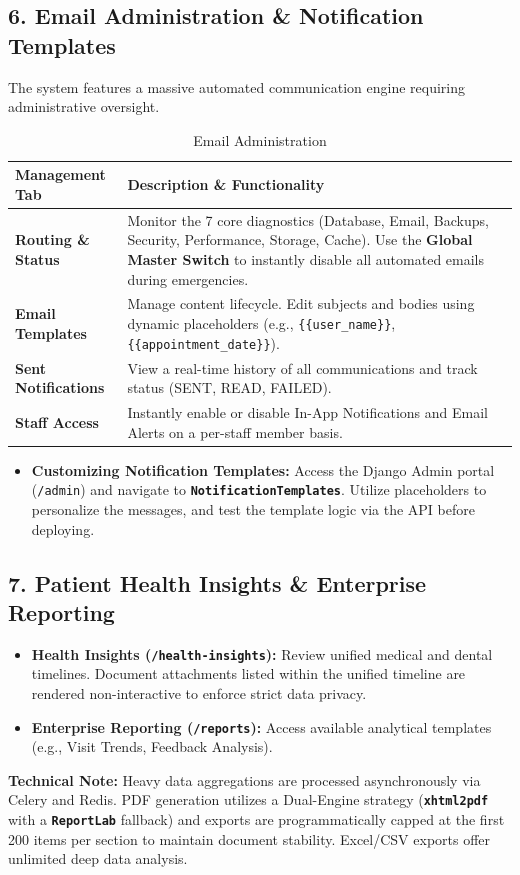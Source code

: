 \subsection{6. Email Administration \& Notification Templates}
The system features a massive automated communication engine requiring administrative oversight.

\begin{table}[htbp]
\centering
\caption{Email Administration}
\begin{tabular}{|p{}|p{}|}
\hline
\textbf{Management Tab} & \textbf{Description \& Functionality} \\
\hline
\textbf{Routing \& Status} & Monitor the 7 core diagnostics (Database, Email, Backups, Security, Performance, Storage, Cache). Use the \textbf{Global Master Switch} to instantly disable all automated emails during emergencies. \\
\hline
\textbf{Email Templates} & Manage content lifecycle. Edit subjects and bodies using dynamic placeholders (e.g., \texttt{\{\{user\_name\}\}}, \texttt{\{\{appointment\_date\}\}}). \\
\hline
\textbf{Sent Notifications} & View a real-time history of all communications and track status (SENT, READ, FAILED). \\
\hline
\textbf{Staff Access} & Instantly enable or disable In-App Notifications and Email Alerts on a per-staff member basis. \\
\hline
\end{tabular}
\end{table}

\begin{itemize}
    \item \textbf{Customizing Notification Templates:} Access the Django Admin portal (\texttt{/admin}) and navigate to \textbf{\texttt{NotificationTemplates}}. Utilize placeholders to personalize the messages, and test the template logic via the API before deploying.
\end{itemize}

\subsection{7. Patient Health Insights \& Enterprise Reporting}
\begin{itemize}
    \item \textbf{Health Insights (\texttt{/health-insights}):} Review unified medical and dental timelines. Document attachments listed within the unified timeline are rendered non-interactive to enforce strict data privacy.
    \item \textbf{Enterprise Reporting (\texttt{/reports}):} Access available analytical templates (e.g., Visit Trends, Feedback Analysis).
\end{itemize}
\textbf{Technical Note:} Heavy data aggregations are processed asynchronously via Celery and Redis. PDF generation utilizes a Dual-Engine strategy (\textbf{\texttt{xhtml2pdf}} with a \textbf{\texttt{ReportLab}} fallback) and exports are programmatically capped at the first 200 items per section to maintain document stability. Excel/CSV exports offer unlimited deep data analysis.

